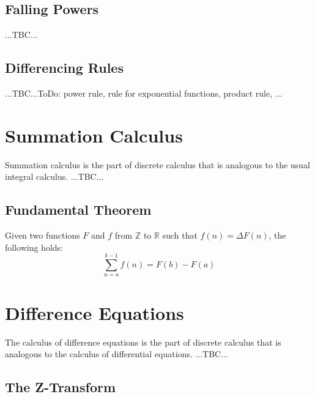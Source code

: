 \subsection{Falling Powers} ...TBC...


\subsection{Differencing Rules}  ...TBC...ToDo: power rule, rule for exponential functions, product rule, ...


\section{Summation Calculus}
Summation calculus is the part of discrete calculus that is analogous to the usual integral calculus. ...TBC...


\subsection{Fundamental Theorem}
Given two functions $F$ and $f$ from $\mathbb{Z}$ to $\mathbb{R}$ such that $f(n) = \Delta F(n)$, the following holds:
\begin{equation}
 \sum_{n=a}^{b-1} f(n) = F(b) - F(a)
\end{equation}




\section{Difference Equations}
The calculus of difference equations is the part of discrete calculus that is analogous to the calculus of differential equations. ...TBC...



\subsection{The Z-Transform}

